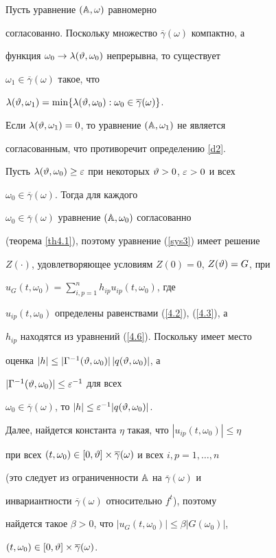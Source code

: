 \begin{pf} Пусть уравнение $(\Bbb A,\omega)$ равномерно


согласованно. Поскольку множество $\overline{\gamma}(\omega)$ компактно, а


функция $\omega_0\to\lambda(\vartheta,\omega_0)$ непрерывна, то существует


$\omega_1\in\overline{\gamma}(\omega)$ такое, что


$\lambda(\vt,\omega_1)=\min\{\lambda(\vt,\omega_0):


\omega_0\in\overline{\gamma}(\omega)\}$.


Если $\lambda(\vartheta,\omega_1)=0$, то уравнение $(\Bbb A,\omega_1)$ не является


согласованным, что противоречит определению \ref{d2}.





Пусть $\lambda(\vartheta,\omega_0)\ge\varepsilon$ при некоторых $\vartheta>0$, $\varepsilon>0$ и всех


$\omega_0\in\overline\gamma(\omega)$. Тогда для каждого


$\omega_0\in\overline\gamma(\omega)$ уравнение $(\Bbb A,\omega_0)$ согласованно


(теорема \ref{th4.1}), поэтому уравнение (\ref{sys3}) имеет решение


$Z(\cdot)$, удовлетворяющее условиям $Z(0)=0$, $Z(\vartheta)=G$, при


$u_G(t,\omega_0)=\sum\limits_{i,p=1}^n h_{ip}u_{ip}(t,\omega_0)$, где


$u_{ip}(t,\omega_0)$ определены равенствами (\ref{4.2}), (\ref{4.3}), а


$h_{ip}$ находятся из уравнений (\ref{4.6}). Поскольку имеет место


оценка $|h|\le|\Gamma^{-1}(\vartheta,\omega_0)|\,|q(\vartheta,\omega_0)|$, а


$|\Gamma^{-1}(\vartheta,\omega_0)|\le\varepsilon^{-1}$ для всех


$\omega_0\in\overline\gamma(\omega)$, то $|h|\le\varepsilon^{-1}|q(\vartheta,\omega_0)|$.


Далее, найдется константа $\eta$ такая, что $|u_{ip}(t,\omega_0)|\le\eta$


при всех $(t,\omega_0)\in[0,\vartheta]\times\overline\gamma(\omega)$ и всех $i,p=1,\dotsc,n$


(это следует из ограниченности $\Bbb A$ на $\overline\gamma(\omega)$ и


инвариантности $\overline\gamma(\omega)$ относительно $f^t$), поэтому


найдется такое $\beta>0$, что $|u_G(t,\omega_0)|\le\beta|G(\omega_0)|$,


$(t,\omega_0)\in[0,\vartheta]\times\overline\gamma(\omega)$.


\end{pf}





